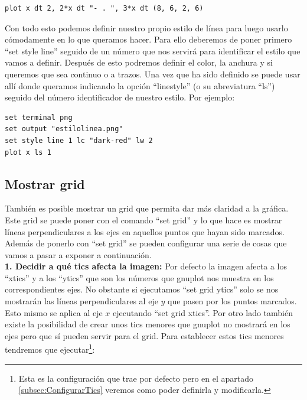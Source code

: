 \documentclass[11pt,a4paper,twoside,pdf]{article}
\numberwithin{equation}{section}
\begin{document}
\begin{lstlisting}[language=Gnuplot]
plot x dt 2, 2*x dt "- . ", 3*x dt (8, 6, 2, 6)
\end{lstlisting}

Con todo esto podemos definir nuestro propio estilo de línea para luego usarlo cómodamente en lo que queramos hacer. Para ello deberemos de poner primero ``set style line'' seguido de un número que nos servirá para identificar el estilo que vamos a definir. Después de esto podremos definir el color, la anchura y si queremos que sea continuo o a trazos. Una vez que ha sido definido se puede usar allí donde queramos indicando la opción ``linestyle'' (o su abreviatura ``ls'') seguido del número identificador de nuestro estilo. Por ejemplo:

\begin{lstlisting}[language=Gnuplot]
set terminal png
set output "estilolinea.png"
set style line 1 lc "dark-red" lw 2
plot x ls 1
\end{lstlisting}

\subsection{Mostrar grid}

También es posible mostrar un grid que permita dar más claridad a la gráfica. Este grid se puede poner con el comando ``set grid'' y lo que hace es mostrar líneas perpendiculares a los ejes en aquellos puntos que hayan sido marcados.\\

Además de ponerlo con ``set grid'' se pueden configurar una serie de cosas que vamos a pasar a exponer a continuación.\\

\textbf{1. Decidir a qué tics afecta la imagen:} Por defecto la imagen afecta a los ``xtics'' y a los ``ytics'' que son los números que gnuplot nos muestra en los correspondientes ejes. No obstante si ejecutamos ``set grid ytics'' solo se nos mostrarán las líneas perpendiculares al eje $y$ que pasen por los puntos marcados. Esto mismo se aplica al eje $x$ ejecutando ``set grid xtics''. Por otro lado también existe la posibilidad de crear unos tics menores que gnuplot no mostrará en los ejes pero que sí pueden servir para el grid. Para establecer estos tics menores tendremos que ejecutar\footnote{Esta es la configuración que trae por defecto pero en el apartado \ref{subsec:ConfigurarTics} veremos como poder definirla y modificarla.}:
\end{document}
